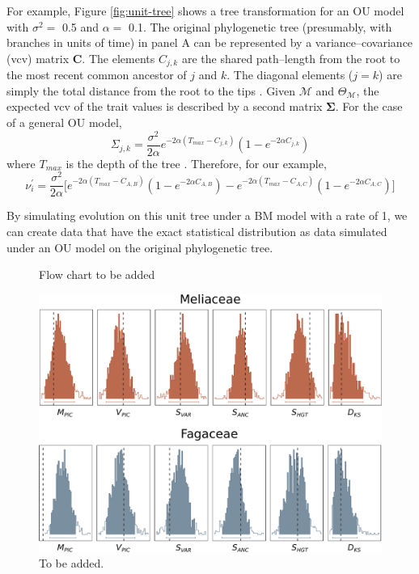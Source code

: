 \documentclass[a4paper,12pt]{article}
\begin{document}
For example, Figure \ref{fig:unit-tree} shows a tree transformation for an OU model with $\sigma^2=$ 0.5 and $\alpha =$ 0.1. The original phylogenetic tree (presumably, with branches in units of time) in panel A can be represented by a variance--covariance (vcv) matrix $\mathbf{C}$. The elements $C_{j,k}$ are the shared path--length from the root to the most recent common ancestor of $j$ and $k$. The diagonal elements ($j = k$) are simply the total distance from the root to the tips \citep{Omeara2006}. Given $\mathcal{M}$ and $\Theta_{\mathcal{M}}$, the expected vcv of the trait values is described by a second matrix $\mathbf{\Sigma}$. For the case of a general OU model,
\begin{equation}
\Sigma_{j,k} = \frac{\sigma^2}{2\alpha} e^{-2\alpha (T_{max} - C_{j,k})} (1 - e^{-2\alpha C_{j,k}})
\end{equation} 
where $T_{max}$ is the depth of the tree \citep{Hansen1997, ButlerKing2004}. Therefore, for our example, 
\begin{equation}
  \nu_i^\prime = \frac{\sigma^2}{2\alpha} \lbrack e^{-2\alpha (T_{max} - C_{A,B})} (1 - e^{-2\alpha C_{A,B}})
- e^{-2\alpha (T_{max} - C_{A,C})} (1 - e^{-2\alpha C_{A,C}}) \rbrack
\end{equation}

By simulating evolution on this unit tree under a BM model with a rate of 1, we can create data that have the exact statistical distribution as data simulated under an OU model on the original phylogenetic tree.


\newpage



\begin{figure}[p]
  \centering
  \caption{Flow chart to be added}
  \label{fig:flowchart}
\end{figure}

\begin{figure}[p]
  \centering
  \includegraphics[scale=0.65]{figs/two-clade-example}
  \caption{To be added.}
  \label{fig:two-clades}
\end{figure}
\end{document}
